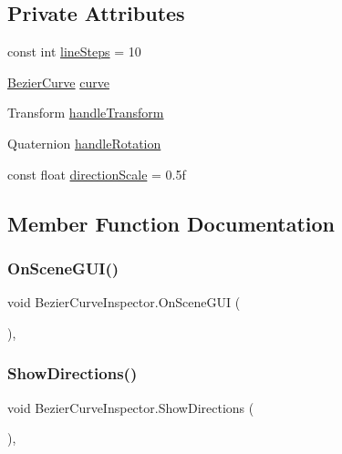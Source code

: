 \subsection*{Private Attributes}
\begin{DoxyCompactItemize}
\item 
const int \hyperlink{classBezierCurveInspector_a6bc9700906d0eb59f3a6ef077babce50}{line\+Steps} = 10
\item 
\hyperlink{classBezierCurve}{Bezier\+Curve} \hyperlink{classBezierCurveInspector_a8e0c756972b42dd58803eb055552a8d9}{curve}
\item 
Transform \hyperlink{classBezierCurveInspector_a556d6234e17e3c8edefb2a2558fd4fe6}{handle\+Transform}
\item 
Quaternion \hyperlink{classBezierCurveInspector_aaec6692f6b6048be6186b642ca783df4}{handle\+Rotation}
\item 
const float \hyperlink{classBezierCurveInspector_ad1b331e90f079da9c65c12387db2ad6d}{direction\+Scale} = 0.\+5f
\end{DoxyCompactItemize}


\subsection{Member Function Documentation}
\mbox{\label{classBezierCurveInspector_abe87f2d75f12adc52633e1d9ba483e32}} 
\subsubsection{\texorpdfstring{On\+Scene\+G\+U\+I()}{OnSceneGUI()}}
{\footnotesize\ttfamily void Bezier\+Curve\+Inspector.\+On\+Scene\+G\+UI (\begin{DoxyParamCaption}{ }\end{DoxyParamCaption})\hspace{0.3cm}{\ttfamily [inline]}, {\ttfamily [private]}}

\mbox{\label{classBezierCurveInspector_a586dff51b6f0a328f1d4df96fb4bcea6}} 
\subsubsection{\texorpdfstring{Show\+Directions()}{ShowDirections()}}
{\footnotesize\ttfamily void Bezier\+Curve\+Inspector.\+Show\+Directions (\begin{DoxyParamCaption}{ }\end{DoxyParamCaption})\hspace{0.3cm}{\ttfamily [inline]}, {\ttfamily [private]}}


